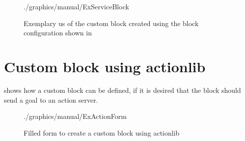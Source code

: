 \begin{figure}[hbp]
	
\end{figure}

\begin{figure}[htbp]
	\centering
	\begin{overpic}[width=0.5\linewidth]{./graphics/manual/ExServiceBlock}
	\end{overpic}
	\caption{Exemplary us of the custom block created using the block configuration shown in }%
	\label{fig:ExServiceBlock}%
\end{figure}

\section{Custom block using actionlib}
 shows how a custom block can be defined, if it is desired that the block should send a goal to an action server.

\begin{figure}[htbp]
	\centering
	\begin{overpic}[width=\linewidth]{./graphics/manual/ExActionForm}
	\end{overpic}
	\caption{Filled form to create a custom block using actionlib}%
	\label{fig:ExActionForm}%
\end{figure}